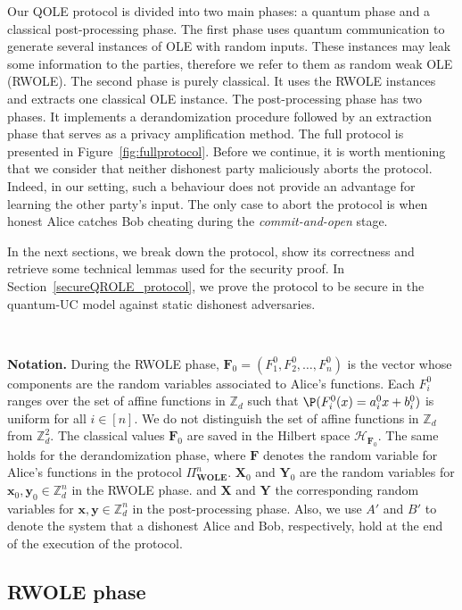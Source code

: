 Our QOLE protocol is divided into two main phases: a quantum phase and a classical post-processing phase. The first phase uses quantum communication to generate several instances of OLE with random inputs. These instances may leak some information to the parties, therefore we refer to them as random weak OLE (RWOLE). The second phase is purely classical. It uses the RWOLE instances and extracts one classical OLE instance. The post-processing phase has two phases. It implements a derandomization procedure followed by an extraction phase that serves as a privacy amplification method. The full protocol is presented in Figure~\ref{fig:fullprotocol}.  Before we continue, it is worth mentioning that we consider that neither dishonest party maliciously aborts the protocol. Indeed, in our setting, such a behaviour does not provide an advantage for learning the other party's input. The only case to abort the protocol is when honest Alice catches Bob cheating during the \textit{commit-and-open} stage.  

In the next sections, we break down the protocol, show its correctness and retrieve some technical lemmas used for the security proof. In Section~\ref{secureQROLE_protocol}, we prove the protocol to be secure in the quantum-UC model against static dishonest adversaries.

\

\noindent\textbf{Notation.}  During the RWOLE phase, $\mathbf{F}_0 = (F^0_1,F^0_2 ,\ldots, F^0_n)$ is the vector whose components are the  random variables associated to Alice's functions. Each  $F^0_i$ ranges over the set of affine functions in $\mathbb{Z}_d$ such that $\P(F^0_i(x)=a^0_ix+ b^0_i)$ is uniform for all $i\in [n]$. We do not distinguish the set of affine functions in $\mathbb{Z}_d$ from $\mathbb{Z}_d^2$. The classical values $\mathbf{F}_0$ are saved in the Hilbert space $\mathcal{H}_{\mathbf{F}_0}$. The same holds for the derandomization phase, where $\mathbf{F}$ denotes the random variable for Alice's functions in the protocol $\Pi^n_{\textbf{WOLE}}$. $\textbf{X}_0$ and $\textbf{Y}_0$ are the random variables for $\textbf{x}_0, \textbf{y}_0 \in \mathbb{Z}^{ n}_d$  in the RWOLE phase. and $\textbf{X}$ and $\textbf{Y}$ the corresponding random variables for $\textbf{x}, \textbf{y} \in \mathbb{Z}^{n}_d$  in the post-processing phase. Also, we use $A'$ and $B'$ to denote the system that a dishonest Alice and Bob, respectively, hold at the end of the execution of the protocol.


\subsection{RWOLE phase}

